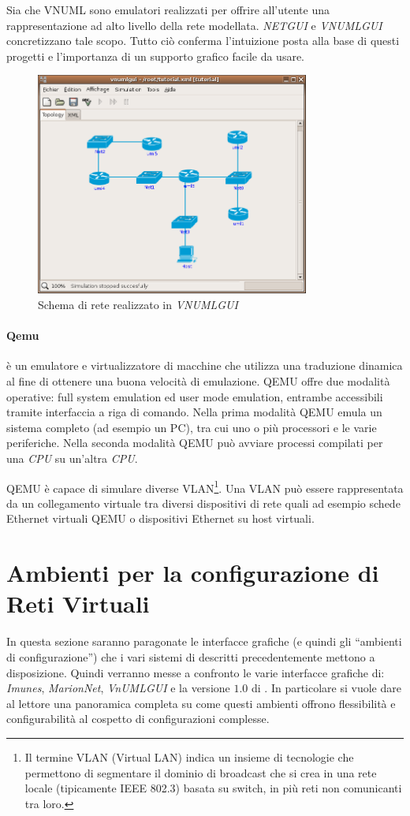 Sia \netkit{} che VNUML sono emulatori realizzati per offrire all'utente una rappresentazione ad alto livello della rete modellata. \emph{NETGUI} e \emph{VNUMLGUI} concretizzano tale scopo. Tutto ciò conferma l'intuizione posta alla base di questi progetti e l'importanza di un supporto grafico facile da usare.

\begin{figure}[!ht]
	\centering
	\includegraphics[width=9cm]{images/vnumlgui.png}
	\caption{Schema di rete realizzato in \emph{VNUMLGUI}}
	\label{figura:vnumlgui}
\end{figure}

\paragraph{Qemu}\cite{QUATC05} è un emulatore e virtualizzatore di macchine che utilizza una traduzione dinamica al fine di ottenere una buona velocità di emulazione. QEMU offre due modalità operative: full system emulation ed user mode emulation, entrambe accessibili tramite interfaccia a riga di comando. Nella prima modalità QEMU emula un sistema completo (ad esempio un PC), tra cui uno o più processori e le varie periferiche. Nella seconda modalità QEMU può avviare processi compilati per una \emph{CPU} su un'altra \emph{CPU}.

QEMU è capace di simulare diverse VLAN\footnote{Il termine VLAN (Virtual LAN) indica un insieme di tecnologie che permettono di segmentare il dominio di broadcast che si crea in una rete locale (tipicamente IEEE 802.3) basata su switch, in più reti non comunicanti tra loro.}. Una VLAN può essere rappresentata da un collegamento virtuale tra diversi dispositivi di rete quali ad esempio schede Ethernet virtuali QEMU o dispositivi Ethernet su host virtuali.

\section{Ambienti per la configurazione di Reti Virtuali}
In questa sezione saranno paragonate le interfacce grafiche (e quindi gli ``ambienti di configurazione'') che i vari sistemi di \emulazione{} descritti precedentemente mettono a disposizione. Quindi verranno messe a confronto le varie interfacce grafiche di: \emph{Imunes}, \emph{MarionNet}, \emph{VnUMLGUI} e la versione $1.0$ di \visualnetkit{}. In particolare si vuole dare al lettore una panoramica completa su come questi ambienti offrono flessibilità e configurabilità al cospetto di configurazioni complesse.

